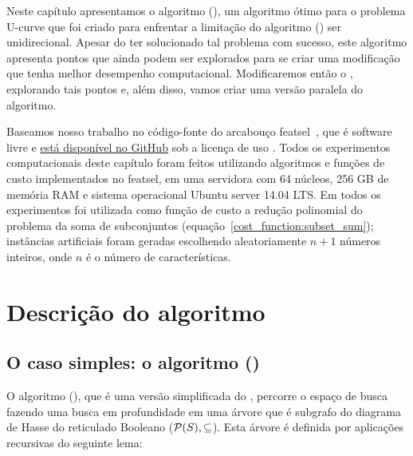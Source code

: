 Neste capítulo apresentamos o algoritmo  
(), um algoritmo ótimo para o problema U-curve que foi 
criado para enfrentar a limitação do algoritmo  () ser unidirecional. Apesar do 
ter solucionado tal problema com sucesso, este algoritmo apresenta 
pontos que ainda podem ser explorados para se criar uma modificação que
tenha melhor desempenho computacional. Modificaremos então o 
, explorando tais pontos e, além disso, vamos criar uma
versão paralela do algoritmo.

Baseamos nosso trabalho no código-fonte do arcabouço featsel~\cite{Reis+17}, que é software 
livre e \href{https://github.com/msreis/featsel}{está disponível no GitHub} sob a licença de uso . Todos os experimentos computacionais deste capítulo foram feitos utilizando algoritmos e funções de custo implementados no featsel, em uma servidora com 64 núcleos, 256 GB de memória RAM e sistema operacional Ubuntu server 14.04 LTS. Em todos os experimentos foi utilizada como função de custo a redução polinomial do problema da soma de subconjuntos (equação~\ref{cost_function:subset_sum}); instâncias artificiais foram geradas escolhendo aleatoriamente $n + 1$ números inteiros, onde $n$ é o número de características.

\section{Descrição do algoritmo}

\subsection{O caso simples: o algoritmo  ()}
O algoritmo  (), que é 
uma versão simplificada do , percorre o espaço de busca 
fazendo uma busca em profundidade em uma árvore que é subgrafo do 
diagrama de Hasse do reticulado Booleano ($\mathcal{P} (S), \subseteq$). 
Esta árvore é definida por aplicações recursivas do seguinte lema:

